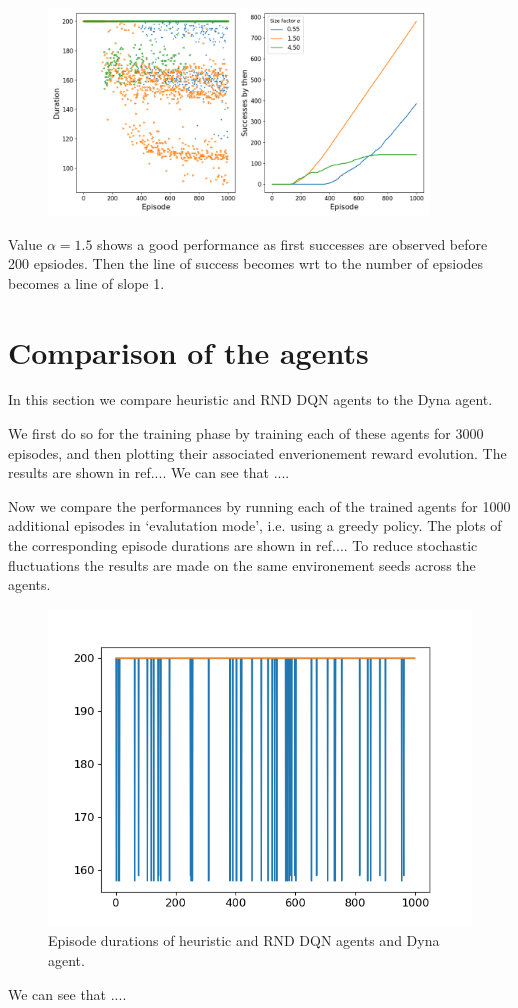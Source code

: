 \documentclass[a4paper, 12pt,oneside]{article}
\begin{document}
        \begin{figure}[h]
            \centering
            \includegraphics[width=0.9\textwidth]{../runs/dyna/dyna_comparison.png}
            \caption{}
            \label{dyna-first}
        \end{figure}
        
        Value $\alpha=1.5$ shows a good performance as first successes are observed before 200 epsiodes. Then the line of success becomes wrt to the number of epsiodes becomes a line of slope 1. 


        
        \section{Comparison of the agents}
        In this section we compare heuristic and RND DQN agents to the Dyna agent. 
        
        We first do so for the training phase by training each of these agents for 3000 episodes, and then plotting their associated enverionement reward evolution. The results are shown in ref{...}.
        We can see that ....

        Now we compare the performances by running each of the trained agents for 1000 additional episodes in `evalutation mode', i.e. using a greedy policy. The plots of the corresponding episode durations are shown in ref{...}. To reduce stochastic fluctuations the results are made on the same environement seeds across the agents.
        \begin{figure}[h!]
            \centering
            \vspace{0em}
            \includegraphics[width=.75\textwidth]{../code/comparison}
            \caption{Episode durations of heuristic and RND DQN agents and Dyna agent.}
            \label{fig:agent-performance-comparison}
        \end{figure}
        We can see that ....
\end{document}
